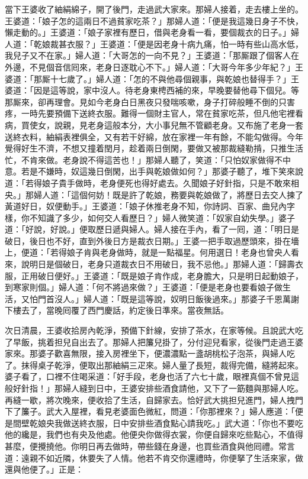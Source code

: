 當下王婆收了紬絹綿子，開了後門，走過武大家來。那婦人接着，走去樓上坐的。王婆道：「娘子怎的這兩日不過貧家吃茶？」那婦人道：「便是我這幾日身子不快，懶走動的。」王婆道：「娘子家裡有歷日，借與老身看一看，要個裁衣的日子。」婦人道：「乾娘裁甚衣服？」王婆道：「便是因老身十病九痛，怕一時有些山高水低，我兒子又不在家。」婦人道：「大哥怎的一向不見？」王婆道：「那厮跟了個客人在外邊，不見個音信囘來，老身日逐耽心不下。」婦人道：「大哥今年多少年紀？」王婆道：「那厮十七歲了。」婦人道：「怎的不與他尋個親事，{}與乾娘也替得手？」王婆道：「因是這等說，家中沒人。待老身東梬西補的來，早晚要替他尋下個兒。等那厮來，卻再理會。見如今老身白日黑夜只發喘咳嗽，身子打碎般睡不倒的只害疼，一時先要預備下送終衣服。難得一個財主官人，常在貧家吃茶，但凡他宅裡看病，買使女，說親，見老身這般本分，大小事兒無不管顧老身。又布施了老身一套送終衣料，{}紬絹表裡俱全，又有若干好綿，放在家裡一年有餘，不能勾做得。今年覺得好生不濟，不想又撞着閏月，趁着兩日倒閑，要做又被那裁縫勒掯，只推生活忙，不肯來做。老身說不得這苦也！」那婦人聽了，笑道：「只怕奴家做得不中意。{}若是不嫌時，奴這幾日倒閑，出手與乾娘做如何？」那婆子聽了，堆下笑來說道：「若得娘子貴手做時，老身便死也得好處去。久聞娘子好針指，只是不敢來相央。」那婦人道：「這個何妨！既是許了乾娘，務要與乾娘做了，將歷日去交人揀了黃道好日，奴便動手。」王婆道：「娘子休推老身不知，你詩詞、百家、曲兒內字樣，你不知識了多少，如何交人看歷日？」婦人微笑道：「奴家自幼失學。」婆子道：「好說，好說。」便取歷日遞與婦人。婦人接在手內，看了一囘，道：「明日是破日，後日也不好，直到外後日方是裁衣日期。」王婆一把手取過歷頭來，掛在墻上，便道：「若得娘子肯與老身做時，就是一點福星。{}何用選日！老身也曾央人看來，說明日是個破日，老身只道裁衣日不用破日，我不忌他。」那婦人道：「歸壽衣服，正用破日便好。」王婆道：「既是娘子肯作成，老身膽大，只是明日起動娘子，到寒家則個。」婦人道：「何不將過來做？」王婆道：「便是老身也要看娘子做生活，又怕門首沒人。」婦人道：「既是這等說，奴明日飯後過來。」那婆子千恩萬謝下樓去了，當晚囘覆了西門慶話，約定後日準來。當夜無話。

次日清晨，王婆收拾房內乾淨，預備下針線，安排了茶水，在家等候。且說武大吃了早飯，挑着担兒自出去了。那婦人把簾兒掛了，分付迎兒看家，從後門走過王婆家來。那婆子歡喜無限，接入房裡坐下，便濃濃點一盞胡桃松子泡茶，與婦人吃了。抹得桌子乾淨，便取出那紬絹三疋來。婦人量了長短，裁得完備，縫將起來。婆子看了，口裡不住喝采道：「好手段，老身也活了六七十歲，眼裡真個不曾見這般好針指！」那婦人縫到日中，王婆安排些酒食請他，又下了一筯麵與那婦人吃。再縫一歇，將次晚來，便收拾了生活，自歸家去。恰好武大挑担兒進門，婦人拽門下了簾子。武大入屋裡，看見老婆面色微紅，問道：「你那裡來？」婦人應道：「便是間壁乾娘央我做送終衣服，日中安排些酒食點心請我吃。」武大道：「你也不要吃他的纔是，我們也有央及他處。他便央你做得衣裳，你便自歸來吃些點心，不值得甚麼，便攪撓他。你明日再去做時，帶些錢在身邊，也買些酒食與他囘禮。常言道：遠親不如近隣，休要失了人情。他若不肯交你還禮時，你便拏了生活來家，做還與他便了。」正是：

